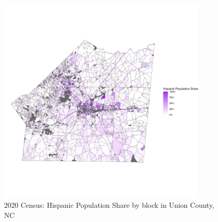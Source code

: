 \documentclass[11pt]{article}
\begin{document}
\begin{figure}
   \centering
   \includegraphics[width=0.9\textwidth]{plots/union_nc.png}
   \caption{2020 Census: Hispanic Population Share by block in Union County, NC}
\end{figure}
\end{document}
